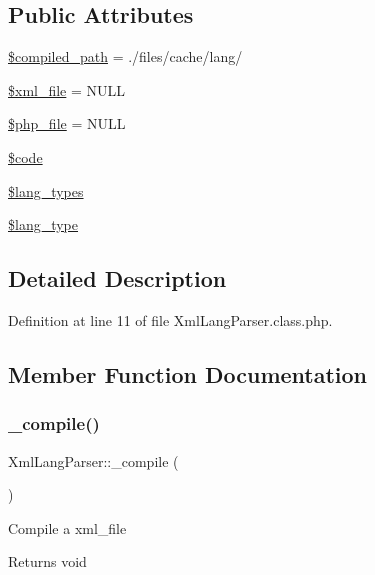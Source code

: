\subsection*{Public Attributes}
\begin{DoxyCompactItemize}
\item 
\hyperlink{classXmlLangParser_af56d412775229f27848e533873fe94f3}{\$compiled\+\_\+path} = \textquotesingle{}./files/cache/lang/\textquotesingle{}
\item 
\hyperlink{classXmlLangParser_a95de36282488ee37a0ef18ef85a6697c}{\$xml\+\_\+file} = N\+U\+LL
\item 
\hyperlink{classXmlLangParser_a0f8639ef765df04b8c4e7903de4353bb}{\$php\+\_\+file} = N\+U\+LL
\item 
\hyperlink{classXmlLangParser_af558c0725662b56f7201d5c0cf9b7761}{\$code}
\item 
\hyperlink{classXmlLangParser_a0385e815b92b65f3b3d12a29e54d1e36}{\$lang\+\_\+types}
\item 
\hyperlink{classXmlLangParser_ac1289e1d349c8e40ef4afd26941cba5d}{\$lang\+\_\+type}
\end{DoxyCompactItemize}


\subsection{Detailed Description}


Definition at line 11 of file Xml\+Lang\+Parser.\+class.\+php.



\subsection{Member Function Documentation}
\hypertarget{classXmlLangParser_a6a27a9fbdd65d3ea3249120f8eb7d9c2}{}\label{classXmlLangParser_a6a27a9fbdd65d3ea3249120f8eb7d9c2} 
\subsubsection{\texorpdfstring{\+\_\+compile()}{\_compile()}}
{\footnotesize\ttfamily Xml\+Lang\+Parser\+::\+\_\+compile (\begin{DoxyParamCaption}{ }\end{DoxyParamCaption})}

Compile a xml\+\_\+file \begin{DoxyReturn}{Returns}
void 
\end{DoxyReturn}


